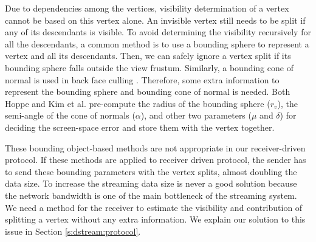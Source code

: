     Due to dependencies among the vertices, visibility determination of a vertex cannot be based 
	on this vertex alone.
    An invisible vertex still needs to be split if any of its descendants is visible. 
    To avoid determining the visibility %
    recursively for all the descendants,
    a common method is to use a bounding sphere to represent a vertex and all its descendants.
    Then, we can safely ignore a vertex split if its bounding sphere
    falls outside the view frustum.
    Similarly, a bounding cone of normal is used in back face culling \cite{258843}.
    Therefore, some extra information to represent the bounding sphere
    and bounding cone of normal is needed. Both Hoppe and Kim et al. \cite{258843, kim:view}
    pre-compute the radius of the bounding sphere ($r_v$), the semi-angle of
    the cone of normals ($\alpha$), and other two parameters
    ($\mu$ and $\delta$) for deciding the screen-space error
    and store them with the vertex together.
    
    These bounding object-based methods are not appropriate
    in our receiver-driven protocol. 
    If these methods are applied to receiver driven protocol, the sender has to send
    these bounding parameters with the vertex splits, almost doubling 
    the data size. To increase the streaming data size is never a good solution
    because the network bandwidth is one of the main bottleneck of the streaming system.
    We need a method for the receiver to estimate the visibility and contribution of 
    splitting a vertex without any extra information.
    We explain our solution to this issue in Section \ref{s:dstream:protocol}.

